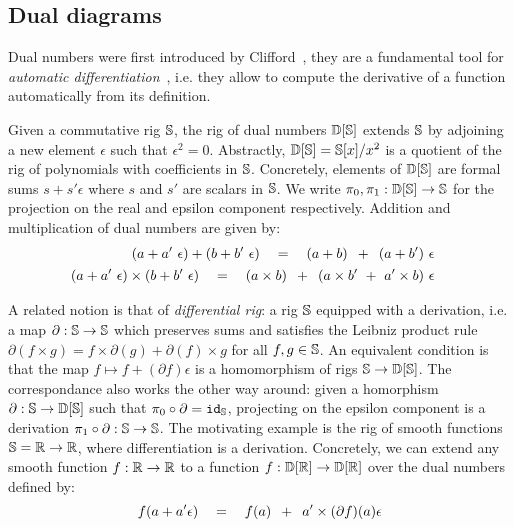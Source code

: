 
\subsection{Dual diagrams}\label{2-dual-diagrams}

Dual numbers were first introduced by Clifford~\cite{Clifford73}, they are a fundamental tool for \emph{automatic differentiation}~\cite{Hoffmann16}, i.e. they allow to compute the derivative of a function automatically from its definition.

Given a commutative rig $\S$, the rig of dual numbers $\D[\S]$ extends $\S$ by adjoining a new element $\epsilon$ such that $\epsilon^2 = 0$.
Abstractly, $\D[\S] = \S[x] / x^2$ is a quotient of the rig of polynomials with coefficients in $\S$.
Concretely, elements of $\D[\S]$ are formal sums $s + s' \epsilon$ where $s$ and $s'$ are scalars in $\S$.
We write $\pi_0, \pi_1 : \D[\S] \to \S$
for the projection on the real and epsilon component respectively.
Addition and multiplication of dual numbers are given by:
\begin{align} \begin{split}\label{linearity}
(a + a' \ \epsilon ) + (b + b' \ \epsilon)
\quad &= \quad (a + b) \s + \s (a + b') \ \epsilon
\end{split}\\
\begin{split}\label{product-rule}
(a + a' \ \epsilon ) \times (b + b' \ \epsilon)
\quad &= \quad (a \times b) \s + \s (a \times b' \ + \ a' \times b) \ \epsilon
\end{split}
\end{align}

A related notion is that of \emph{differential rig}: a rig $\S$ equipped with a derivation, i.e. a map $\partial : \S \to \S$ which preserves sums and satisfies the Leibniz product rule
$\partial(f \times g) = f \times \partial(g) + \partial(f) \times g$ for all $f, g \in \S$.
An equivalent condition is that the map $f \mapsto f + (\partial f) \epsilon$ is a homomorphism of rigs $\S \to \D[\S]$.
The correspondance also works the other way around: given a homorphism $\partial : \S \to \D[\S]$ such that $\pi_0 \circ \partial = \id_\S$, projecting on the epsilon component is a derivation $\pi_1 \circ \partial : \S \to \S$.
The motivating example is the rig of smooth functions $\S = \R \to \R$, where differentiation is a derivation.
Concretely, we can extend any smooth function $f : \R \to \R$ to a function $f : \D[\R] \to \D[\R]$ over the dual numbers defined by:
\begin{equation}\label{dual-numbers-eq}
f(a + a' \epsilon) \quad = \quad f(a) \s + \s a' \times (\partial f)(a) \epsilon
\end{equation}

